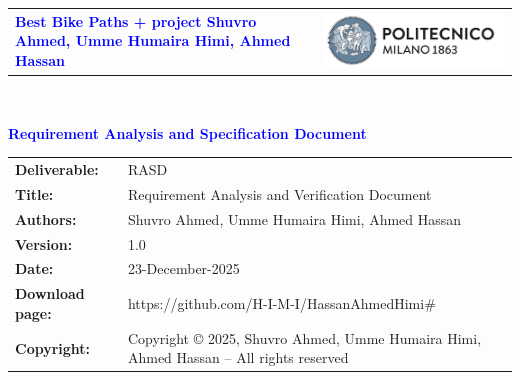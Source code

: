 \documentclass[11pt]{article}
\begin{document}

\begin{titlepage}



{\begin{table}[t!]
\centering
\begin{tabu} to \textwidth { X[1.3,r,p] X[1.7,l,p] }
\textcolor{Blue}
{\textbf{\small{Best Bike Paths + project Shuvro Ahmed, Umme Humaira Himi, Ahmed Hassan}}} & \includegraphics[scale=0.5]{Images/PolimiLogo}
\end{tabu}
\end{table}}~\\ [7cm]


\begin{flushleft}

{\textcolor{Blue}{\textbf{\Huge{Requirement Analysis and Specification
        Document}}}} \\ [1cm]

\end{flushleft}

\end{titlepage}

\begin{table}[h!]
\begin{tabu} to \textwidth { X[0.3,r,p] X[0.7,l,p] }
\hline

\textbf{Deliverable:} & RASD\\
\textbf{Title:} & Requirement Analysis and Verification Document \\
\textbf{Authors:} & Shuvro Ahmed, Umme Humaira Himi, Ahmed Hassan \\
\textbf{Version:} & 1.0 \\ 
\textbf{Date:} & 23-December-2025 \\
\textbf{Download page:} & https://github.com/H-I-M-I/HassanAhmedHimi# \\
\textbf{Copyright:} & Copyright © 2025, Shuvro Ahmed, Umme Humaira Himi, Ahmed Hassan – All rights reserved \\
\hline
\end{tabu}
\end{table}
\end{document}

